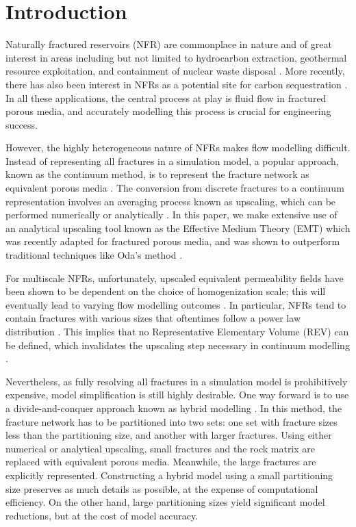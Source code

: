 \documentclass[a4paper]{article}
\begin{document}
\section{Introduction}
Naturally fractured reservoirs (NFR) are commonplace in nature and of great interest in areas including but not limited to hydrocarbon extraction, geothermal resource exploitation, and containment of nuclear waste disposal \citep{Berkowitz2002}. More recently, there has also been 
interest in NFRs as a potential site for carbon sequestration \citep{March2018}. In all these applications, the central process at play is fluid flow in fractured porous media, and accurately modelling this process is crucial for engineering success.

However, the highly heterogeneous nature of NFRs makes flow modelling difficult. Instead of representing all fractures in a simulation model, a popular approach, known as the continuum method, is to represent the fracture network as equivalent porous media \citep{Ezulike2013, Warren1963, Yan2016}. The conversion from discrete fractures to a continuum representation involves an averaging process known as upscaling, which can be performed numerically or analytically \citep{Durlofsky1991,Oda1985,Renard1997,Saevik2013}. In this paper, we make extensive use of an analytical upscaling tool known as the Effective Medium Theory (EMT) which was recently adapted for fractured porous media, and was shown to outperform traditional techniques like Oda's method \citep{Oda1985, Saevik2013, Saevik2014}. 

For multiscale NFRs, unfortunately, upscaled equivalent permeability fields have been shown to be dependent on the choice of homogenization scale; this will eventually lead to varying flow modelling outcomes \citep{Elfeel2013}. In particular, NFRs tend to contain fractures with various sizes that oftentimes follow a power law distribution \citep{Bonnet2001}. This implies that no Representative Elementary Volume (REV) can be defined, which invalidates the upscaling step necessary in continuum modelling \citep{Berkowitz2002}.

Nevertheless, as fully resolving all fractures in a simulation model is prohibitively expensive, model simplification is still highly desirable. One way forward is to use a divide-and-conquer approach known as hybrid modelling \citep{Berkowitz2002}. In this method, the fracture network has to be partitioned into two sets: one set with fracture sizes less than the partitioning size, and another with larger fractures. Using either numerical or analytical upscaling, small fractures and the rock matrix are replaced with equivalent porous media. Meanwhile, the large fractures are explicitly represented. Constructing a hybrid model using a small partitioning size preserves as much details as possible, at the expense of computational efficiency. On the other hand, large partitioning sizes yield significant model reductions, but at the cost of model accuracy.
\end{document}
